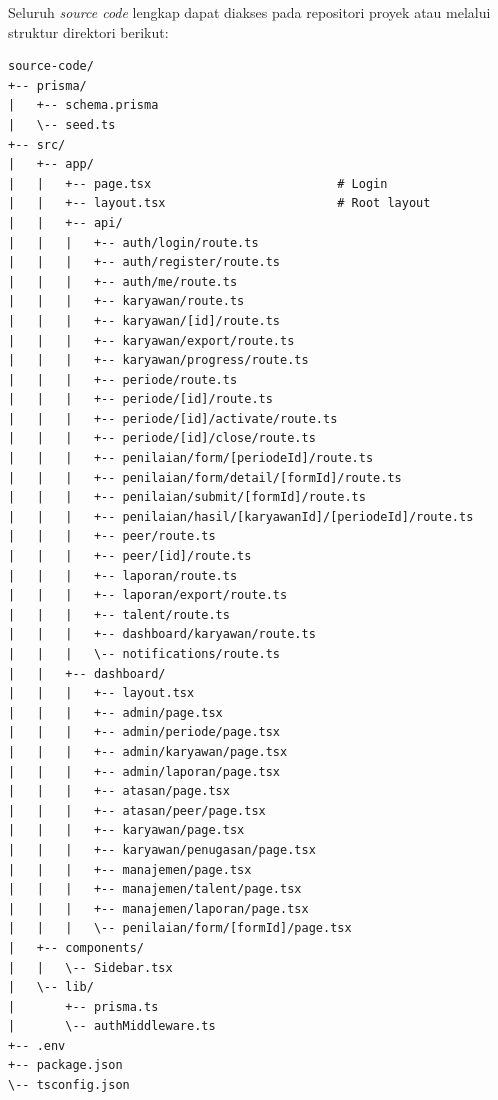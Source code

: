 \documentclass[12pt,a4paper,oneside]{report}
\begin{document}


Seluruh \textit{source code} lengkap dapat diakses pada repositori proyek atau melalui struktur direktori berikut:

\begin{verbatim}
source-code/
+-- prisma/
|   +-- schema.prisma
|   \-- seed.ts
+-- src/
|   +-- app/
|   |   +-- page.tsx                          # Login
|   |   +-- layout.tsx                        # Root layout
|   |   +-- api/
|   |   |   +-- auth/login/route.ts
|   |   |   +-- auth/register/route.ts
|   |   |   +-- auth/me/route.ts
|   |   |   +-- karyawan/route.ts
|   |   |   +-- karyawan/[id]/route.ts
|   |   |   +-- karyawan/export/route.ts
|   |   |   +-- karyawan/progress/route.ts
|   |   |   +-- periode/route.ts
|   |   |   +-- periode/[id]/route.ts
|   |   |   +-- periode/[id]/activate/route.ts
|   |   |   +-- periode/[id]/close/route.ts
|   |   |   +-- penilaian/form/[periodeId]/route.ts
|   |   |   +-- penilaian/form/detail/[formId]/route.ts
|   |   |   +-- penilaian/submit/[formId]/route.ts
|   |   |   +-- penilaian/hasil/[karyawanId]/[periodeId]/route.ts
|   |   |   +-- peer/route.ts
|   |   |   +-- peer/[id]/route.ts
|   |   |   +-- laporan/route.ts
|   |   |   +-- laporan/export/route.ts
|   |   |   +-- talent/route.ts
|   |   |   +-- dashboard/karyawan/route.ts
|   |   |   \-- notifications/route.ts
|   |   +-- dashboard/
|   |   |   +-- layout.tsx
|   |   |   +-- admin/page.tsx
|   |   |   +-- admin/periode/page.tsx
|   |   |   +-- admin/karyawan/page.tsx
|   |   |   +-- admin/laporan/page.tsx
|   |   |   +-- atasan/page.tsx
|   |   |   +-- atasan/peer/page.tsx
|   |   |   +-- karyawan/page.tsx
|   |   |   +-- karyawan/penugasan/page.tsx
|   |   |   +-- manajemen/page.tsx
|   |   |   +-- manajemen/talent/page.tsx
|   |   |   +-- manajemen/laporan/page.tsx
|   |   |   \-- penilaian/form/[formId]/page.tsx
|   +-- components/
|   |   \-- Sidebar.tsx
|   \-- lib/
|       +-- prisma.ts
|       \-- authMiddleware.ts
+-- .env
+-- package.json
\-- tsconfig.json
\end{verbatim}

\end{document}
